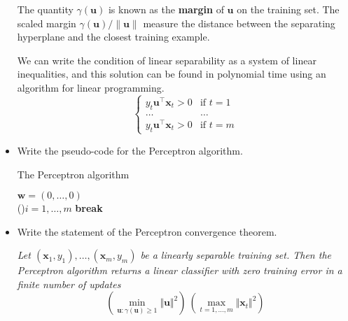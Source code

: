 \begin{itemize}
        The quantity $\gamma(\boldsymbol{u})$ is known as the \textbf{margin} of $\boldsymbol{u}$ on the training set. The scaled margin $\gamma(\boldsymbol{u}) / \lVert\boldsymbol{u}\lVert$ measure the distance between the separating hyperplane and the closest training example.

        We can write the condition of linear separability as a system of linear inequalities, and this solution can be found in polynomial time using an algorithm for linear programming.\\
        $$
        \begin{cases}
            y_t\boldsymbol{u}^{\top}\boldsymbol{x}_t > 0 & \text{if } t = 1\\
            \dots & \dots\\
            y_t\boldsymbol{u}^{\top}\boldsymbol{x}_t > 0 & \text{if } t = m
        \end{cases}
        $$
    
    \item Write the pseudo-code for the Perceptron algorithm.\\

        \begin{algorithm}[H]
            \SetAlgoLined
            \DontPrintSemicolon
            \caption{The Perceptron algorithm}
            $\boldsymbol{w} = (0, \dots, 0)$\\
         {  
            \For(){$i = 1, \dots, m$}{
            }
             {
                \textbf{break}
            } 
           }
        \end{algorithm}

    \item Write the statement of the Perceptron convergence theorem.
    
        \textit{Let $(\boldsymbol{x}_1 , y_1 ), \dots, (\boldsymbol{x}_m , y_m)$ be a linearly separable training set. Then the Perceptron algorithm returns a linear classifier with zero training error in a finite number of updates}
        $$
        \left(\underset{\boldsymbol{u} : \gamma(\boldsymbol{u}) \geq 1}{\min} \Vert \boldsymbol{u} \Vert^2 \right) \ \left( \underset{t = 1, \dots, m}{\max} \Vert \boldsymbol{x}_t \Vert^2 \right)
        $$


\end{itemize}
